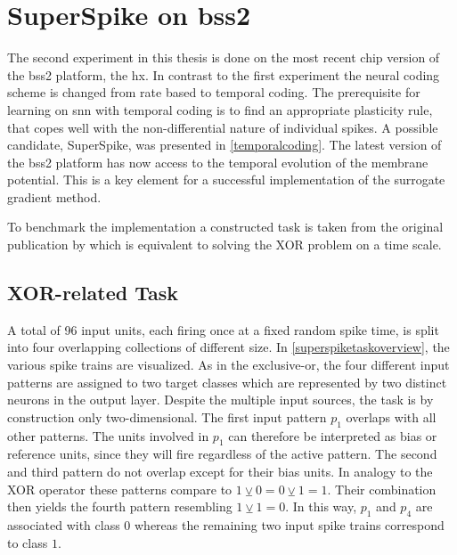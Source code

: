\chapter{SuperSpike on \acrshort{bss2}}
\label{superspike}
The second experiment in this thesis is done on the most recent chip version of the \gls{bss2} platform, the \gls{hx}. In contrast to the first experiment the neural coding scheme is changed from rate based to temporal coding. The prerequisite for learning on \gls{snn} with temporal coding is to find an appropriate plasticity rule, that copes well with the non-differential nature of individual spikes. A possible candidate, SuperSpike, was presented in \cref{temporalcoding}. The latest version of the \gls{bss2} platform has now access to the temporal evolution of the membrane potential. This is a key element for a successful implementation of the surrogate gradient method.

To benchmark the implementation a constructed task is taken from the original publication by \cite{zenke2018superspike} which is equivalent to solving the XOR problem on a time scale.

\section{XOR-related Task}
A total of 96 input units, each firing once at a fixed random spike time, is split into four overlapping collections of different size. In \cref{superspiketaskoverview}, the various spike trains are visualized. As in the exclusive-or, the four different input patterns are assigned to two target classes which are represented by two distinct neurons in the output layer. Despite the multiple input sources, the task is by construction only two-dimensional. The first input pattern $p_1$ overlaps with all other patterns. The units involved in $p_1$ can therefore be interpreted as bias or reference units, since they will fire regardless of the active pattern. The second and third pattern do not overlap except for their bias units. In analogy to the XOR operator these patterns compare to $1 \veebar 0 = 0 \veebar 1 = 1$. Their combination then yields the fourth pattern resembling $1 \veebar 1 = 0$. In this way, $p_1$ and $p_4$ are associated with class $0$ whereas the remaining two input spike trains correspond to class $1$. 

